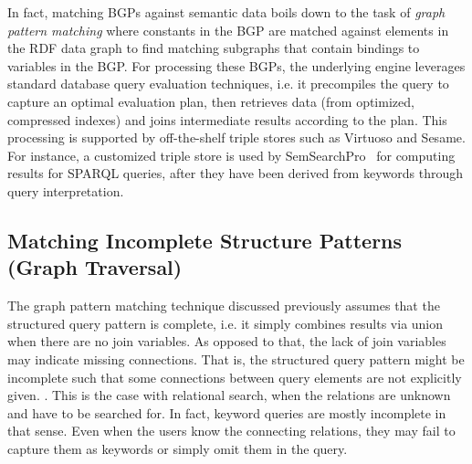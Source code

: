 	In fact, matching BGPs against semantic data boils down to the task of \emph{graph pattern matching} where constants in the BGP are matched against elements in the RDF data graph to find matching subgraphs that contain bindings to variables in the BGP. For processing these BGPs, the underlying engine leverages standard database query evaluation techniques, i.e. it precompiles the query to capture an optimal evaluation plan, then retrieves data (from optimized, compressed indexes) and joins intermediate results according to the plan. This processing is supported by off-the-shelf triple stores such as Virtuoso and Sesame. For instance, a customized triple store is used by SemSearchPro~\cite{DBLP:journals/ws/TranHL11} for computing results for SPARQL queries, after they have been derived from keywords through query interpretation. 
	
	\subsection{Matching Incomplete Structure Patterns (Graph Traversal)} The graph pattern matching technique discussed previously assumes that the structured query pattern is complete, i.e. it simply combines results via union when there are no join variables. As opposed to that, the lack of join variables may indicate missing connections. That is, the structured query pattern might be incomplete such that some connections between query elements are not explicitly given. . This is the case with relational search, when the relations are unknown and have to be searched for. In fact, keyword queries are mostly incomplete in that sense. Even when the users know the connecting relations, they may fail to capture them as keywords or simply omit them in the query. 
	
